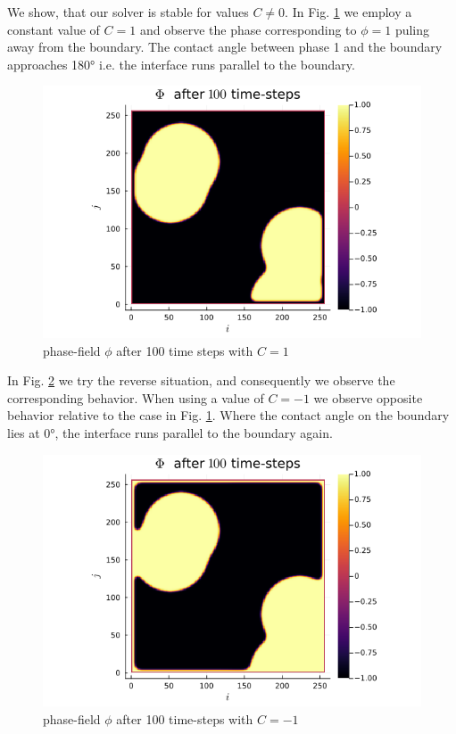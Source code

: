 \documentclass{mimosis}
\begin{document}
We show, that our solver is stable for values \(C \neq 0\). In Fig. \ref{fig:angle1} we employ a constant value of \(C=1\) and observe the phase corresponding to \(\phi = 1\) puling away from the boundary. The contact angle between phase 1 and the boundary approaches 180° i.e. the interface runs parallel to the boundary.
\begin{figure}[htbp]
\centering
\includegraphics[width=.9\linewidth]{images/angle1.png}
\caption{\label{fig:angle1}phase-field   \(\phi\) after 100 time steps with \(C=1\)}
\end{figure}


In Fig. \ref{fig:angle-1} we try the reverse situation, and consequently we observe the corresponding behavior. When using a value of \(C=-1\) we observe opposite behavior relative to the case in Fig. \ref{fig:angle1}. Where the contact angle on the boundary lies at 0°, the interface runs parallel to the boundary again.
\begin{figure}[htbp]
\centering
\includegraphics[width=.9\linewidth]{images/angle-.png}
\caption{\label{fig:angle-1}phase-field \(\phi\) after 100 time-steps with \(C=-1\)}
\end{figure}
\end{document}
